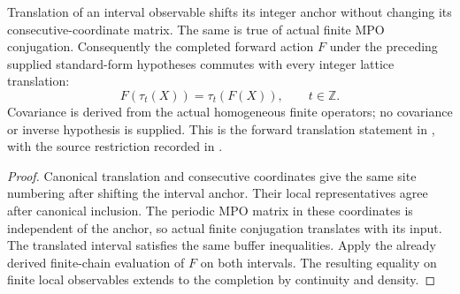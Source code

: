 \begin{lemma}
    \label{lem:mpu_finite_heisenberg_translation_covariance}
    \leanok
    Translation of an interval observable shifts its integer anchor
    without changing its consecutive-coordinate matrix. The same is
    true of actual finite MPO conjugation. Consequently the completed
    forward action $F$ under the preceding supplied standard-form
    hypotheses commutes with every integer lattice translation:
    \[
        F(\tau_t(X))=\tau_t(F(X)),\qquad t\in\mathbb Z.
    \]
    Covariance is derived from the actual homogeneous finite operators;
    no covariance or inverse hypothesis is supplied. This is the
    forward translation statement in
    \cite[lines~2292--2306]{Cirac2017MPU}, with the source restriction
    recorded in \cite{gap:mpu_qca_complete_block_heisenberg_scope}.
\end{lemma}
\begin{proof}\leanok
    Canonical translation and consecutive coordinates give the same
    site numbering after shifting the interval anchor. Their local
    representatives agree after canonical inclusion. The periodic
    MPO matrix in these coordinates is independent of the anchor,
    so actual finite conjugation translates with its input. The
    translated interval satisfies the same buffer inequalities.
    Apply the already derived finite-chain evaluation of $F$ on both
    intervals. The resulting equality on finite local observables
    extends to the completion by continuity and density.
\end{proof}



